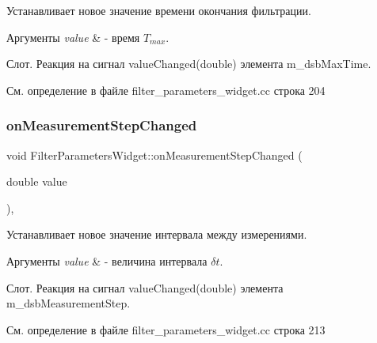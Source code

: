 Устанавливает новое значение времени окончания фильтрации. 


\begin{DoxyParams}{Аргументы}
{\em value} & -\/ время $T_{max}$.\\
\hline
\end{DoxyParams}
Слот. Реакция на сигнал value\+Changed(double) элемента m\+\_\+dsb\+Max\+Time. 

См. определение в файле filter\+\_\+parameters\+\_\+widget.\+cc строка 204

\hypertarget{class_filter_parameters_widget_afdabd842b69fd6a4b65b4d44a5c81c55}{}\label{class_filter_parameters_widget_afdabd842b69fd6a4b65b4d44a5c81c55} 
\subsubsection{\texorpdfstring{on\+Measurement\+Step\+Changed}{onMeasurementStepChanged}}
{\footnotesize\ttfamily void Filter\+Parameters\+Widget\+::on\+Measurement\+Step\+Changed (\begin{DoxyParamCaption}\item[{double}]{value }\end{DoxyParamCaption})\hspace{0.3cm}{\ttfamily [private]}, {\ttfamily [slot]}}



Устанавливает новое значение интервала между измерениями. 


\begin{DoxyParams}{Аргументы}
{\em value} & -\/ величина интервала $\delta t$.\\
\hline
\end{DoxyParams}
Слот. Реакция на сигнал value\+Changed(double) элемента m\+\_\+dsb\+Measurement\+Step. 

См. определение в файле filter\+\_\+parameters\+\_\+widget.\+cc строка 213

\hypertarget{class_filter_parameters_widget_adacd531098565f7b21bd8d958a35fa74}{}\label{class_filter_parameters_widget_adacd531098565f7b21bd8d958a35fa74} 
